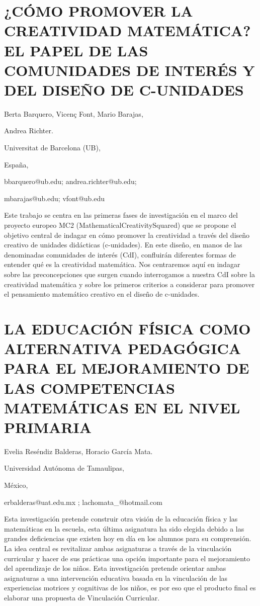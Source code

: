 \section{¿CÓMO PROMOVER LA CREATIVIDAD MATEMÁTICA? EL PAPEL DE LAS COMUNIDADES
DE INTERÉS Y DEL DISEÑO DE C-UNIDADES}

\begin{datos}

Berta Barquero, Vicenç Font, Mario Barajas, 

Andrea Richter.

Universitat de Barcelona (UB),

España,

bbarquero@ub.edu; andrea.richter@ub.edu; 

mbarajas@ub.edu; vfont@ub.edu

\end{datos}

Este trabajo se centra en las primeras fases de investigación en el
marco del proyecto europeo MC2 (MathematicalCreativitySquared) que
se propone el objetivo central de indagar en cómo promover la creatividad
a través del diseño creativo de unidades didácticas (c-unidades).
En este diseño, en manos de las denominadas comunidades de interés
(CdI), confluirán diferentes formas de entender qué es la creatividad
matemática. Nos centraremos aquí en indagar sobre las preconcepciones
que surgen cuando interrogamos a nuestra CdI sobre la creatividad
matemática y sobre los primeros criterios a considerar para promover
el pensamiento matemático creativo en el diseño de c-unidades.


\section{LA EDUCACIÓN FÍSICA COMO ALTERNATIVA PEDAGÓGICA PARA EL MEJORAMIENTO
DE LAS COMPETENCIAS MATEMÁTICAS EN EL NIVEL PRIMARIA}

\begin{datos}

Evelia Reséndiz Balderas, Horacio García Mata.

Universidad Autónoma de Tamaulipas,

México,

erbalderas@uat.edu.mx ; lachomata\_@hotmail.com

\end{datos}

Esta investigación pretende construir otra visión de la educación
física y las matemáticas en la escuela, esta última asignatura ha
sido elegida debido a las grandes deficiencias que existen hoy en
día en los alumnos para su comprensión. La idea central es revitalizar
ambas asignaturas a través de la vinculación curricular y hacer de
sus prácticas una opción importante para el mejoramiento del aprendizaje
de los niños. Esta investigación pretende orientar ambas asignaturas
a una intervención educativa basada en la vinculación de las experiencias
motrices y cognitivas de los niños, es por eso que el producto final
es elaborar una propuesta de Vinculación Curricular.


